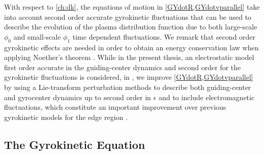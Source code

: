 With respect to \cref{ch:dk}, the equations of motion in \cref{GYdotR,GYdotvparallel} take into account second order accurate gyrokinetic fluctuations that can be used to describe the evolution of the plasma distribution function due to both large-scale $\phi_0$ and small-scale $\phi_1$ time dependent fluctuations.
%
We remark that second order gyrokinetic effects are needed in order to obtain an energy conservation law when applying Noether's theorem \citep{Brizard2007a}.
%
While in the present thesis, an electrostatic model first order accurate in the guiding-center dynamics and second order for the gyrokinetic fluctuations is considered, in \citet{Frei2019}, we improve \cref{GYdotR,GYdotvparallel} by using a Lie-transform perturbation methods to describe both guiding-center and gyrocenter dynamics up to second order in $\epsilon$ and to include electromagnetic fluctuations, which constitute an important improvement over previous gyrokinetic models for the edge region \citep{Hahm2009,Dimits2012,Madsen2013}.

\subsection{The Gyrokinetic Equation}

